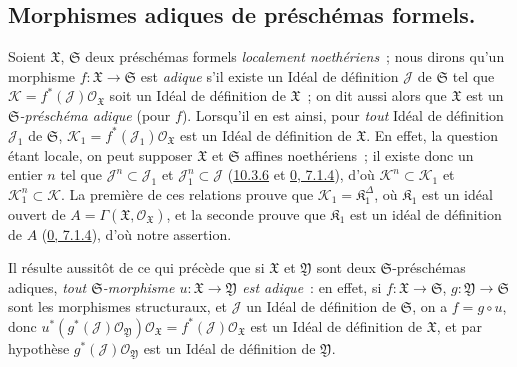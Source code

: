 
\subsection{Morphismes adiques de préschémas formels.}
\label{subsection:I.10.12-fr}

\begin{env}[10.12.1]
\label{I.10.12.1-fr}
Soient $\mathfrak{X}$, $\mathfrak{S}$ deux préschémas formels
\emph{localement noethériens}~; nous dirons qu'un morphisme
$f:\mathfrak{X}\to\mathfrak{S}$ est \emph{adique} s'il existe un Idéal
de définition $\mathscr{J}$ de $\mathfrak{S}$ tel que
$\mathscr{K}=f^*(\mathscr{J})\mathscr{O}_{\mathfrak{X}}$ soit un Idéal de
définition de $\mathfrak{X}$~; on dit aussi alors que $\mathfrak{X}$ est
un \emph{$\mathfrak{S}$-préschéma adique} (pour $f$). Lorsqu'il en est
ainsi, pour \emph{tout} Idéal de définition $\mathscr{J}_1$ de
$\mathfrak{S}$,
$\mathscr{K}_1=f^*(\mathscr{J}_1)\mathscr{O}_{\mathfrak{X}}$ est un Idéal
de définition de $\mathfrak{X}$. En effet, la question étant locale, on
peut supposer $\mathfrak{X}$ et $\mathfrak{S}$ affines noethériens~; il
existe donc un entier $n$ tel que $\mathscr{J}^n\subset\mathscr{J}_1$ et
$\mathscr{J}_1^n\subset\mathscr{J}$
(\hyperref[I.10.3.6-fr]{10.3.6} et
\hyperref[0.7.1.4-fr]{0, 7.1.4}), d'où
$\mathscr{K}^n\subset\mathscr{K}_1$ et
$\mathscr{K}_1^n\subset\mathscr{K}$. La première de ces relations prouve
que $\mathscr{K}_1=\mathfrak{K}_1^\Delta$, où $\mathfrak{K}_1$ est un
idéal ouvert de
$A=\Gamma(\mathfrak{X},\mathscr{O}_{\mathfrak{X}})$, et la seconde prouve
que $\mathfrak{K}_1$ est un idéal de définition de $A$
(\hyperref[0.7.1.4-fr]{0, 7.1.4}), d'où notre assertion.
\end{env}

Il résulte aussitôt de ce qui précède que si $\mathfrak{X}$ et
$\mathfrak{Y}$ sont deux $\mathfrak{S}$-préschémas adiques, \emph{tout
$\mathfrak{S}$-morphisme $u:\mathfrak{X}\to\mathfrak{Y}$ est adique}~:
en effet, si $f:\mathfrak{X}\to\mathfrak{S}$,
$g:\mathfrak{Y}\to\mathfrak{S}$ sont les morphismes structuraux, et
$\mathscr{J}$ un Idéal de définition de $\mathfrak{S}$, on a
$f=g\circ u$, donc
$u^*(g^*(\mathscr{J})\mathscr{O}_{\mathfrak{Y}})
\mathscr{O}_{\mathfrak{X}}=f^*(\mathscr{J})
\mathscr{O}_{\mathfrak{X}}$ est un Idéal de définition de
$\mathfrak{X}$, et par hypothèse
$g^*(\mathscr{J})\mathscr{O}_{\mathfrak{Y}}$ est un Idéal de définition
de $\mathfrak{Y}$.

